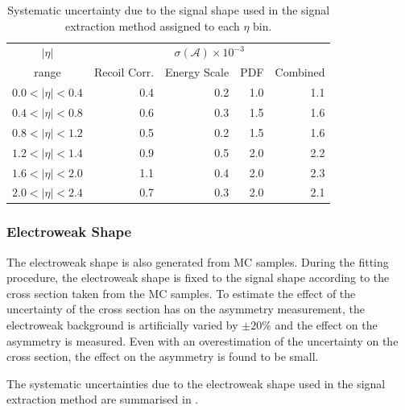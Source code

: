 \begin{table}[htbp]
\begin{center}
\begin{tabular}{crrrr}
    \toprule
$|\eta|$   & \multicolumn{4}{c}{$\sigma(\mathcal{A}) \times 10^{-3}$}\\
range      & Recoil Corr. & Energy Scale & PDF & Combined \\
\midrule
$0.0<|\eta|<0.4$ &  0.4 & 0.2 & 1.0  & 1.1 \\
$0.4<|\eta|<0.8$ &  0.6 & 0.3 & 1.5  & 1.6 \\
$0.8<|\eta|<1.2$ &  0.5 & 0.2 & 1.5  & 1.6 \\
$1.2<|\eta|<1.4$ &  0.9 & 0.5 & 2.0  & 2.2 \\
$1.6<|\eta|<2.0$ &  1.1 & 0.4 & 2.0  & 2.3 \\
$2.0<|\eta|<2.4$ &  0.7 & 0.3 & 2.0  & 2.1 \\
    \bottomrule
\end{tabular}
\caption{\label{tab:systSIG}Systematic uncertainty due to the signal \ETm shape used in the signal
extraction method assigned to each $\eta$ bin\cite{baisini2010electron}.}
\end{center}
\end{table}

\subsubsection{{Electroweak} \ETm Shape}

The {electroweak} shape is also generated from {MC} samples. During the fitting
procedure, the {electroweak} shape is fixed to the \Wenu signal shape according to
the cross section taken from the {MC} samples. To estimate the effect of the
uncertainty of the cross section has on the asymmetry measurement, the {electroweak}
background is artificially varied by $\pm20\%$ and the effect on the
asymmetry is measured. Even with an overestimation of the uncertainty on the
cross section, the effect on the asymmetry is found to be small.

The systematic uncertainties due to the electroweak \ETm shape used in the signal
extraction method are summarised in .

